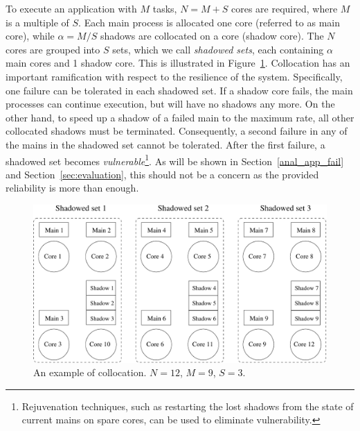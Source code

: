 
To execute an application with $M$ tasks, $N=M+S$ cores are required, where $M$ is a multiple of $S$. Each main process is allocated one core (referred to as main core), while $\alpha=M/S$ shadows are collocated on a core (shadow core). 
The $N$ cores are grouped into $S$ sets, which we call \emph{shadowed sets}, each containing $\alpha$ main cores and 1 shadow core.
This is illustrated in Figure~\ref{fig:sc_mapping}.  
Collocation has an important ramification with respect to the resilience of the system. Specifically, 
one failure can be tolerated in each shadowed set. If a shadow core fails, the main processes can continue
execution, but will have no shadows any more. On the other hand, 
to speed up a shadow 
of a failed main to the maximum rate, all other collocated shadows must be terminated. Consequently, a second failure in any of the mains in the shadowed set cannot be tolerated. After the first failure, a shadowed set becomes \emph{vulnerable}\footnote{Rejuvenation techniques, such as restarting the lost shadows from the state of current mains on spare cores, can be used to eliminate vulnerability.}. 
As will be shown in Section~\ref{anal_app_fail} and Section~\ref{sec:evaluation}, this should not be a concern as the provided reliability is more than enough.
 
\begin{figure}[!t]
  \begin{center}
    \includegraphics[width=\columnwidth]{Figures/sc_mapping.pdf}
  \end{center}
  \caption{An example of collocation. $N=12$, $M=9$, $S=3$.}
  \label{fig:sc_mapping}
\end{figure}



